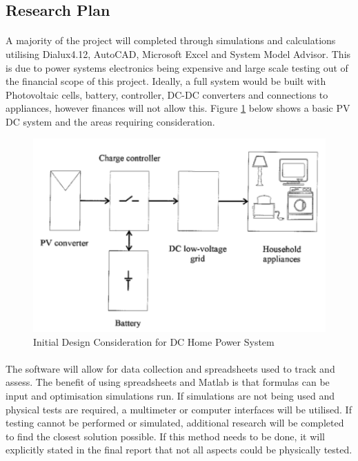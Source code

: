 \subsection{Research Plan}

\paragraph{}
A majority of the project will completed through simulations and calculations utilising Dialux4.12, AutoCAD, Microsoft Excel and System Model Advisor. This is due to power systems electronics being expensive and large scale testing out of the financial scope of this project. Ideally, a full system would be built with Photovoltaic cells, battery, controller, DC-DC converters and connections to appliances, however finances will not allow this. Figure \ref{fig:DCHomeSystem} below shows a basic PV DC system and the areas requiring consideration. 

\begin{figure}[H]
\hfill\includegraphics[width = 120mm]{images/DC_Home}\hspace*{\fill}
\caption{Initial Design Consideration for DC Home Power System \cite{Pellis1997}} 
\label{fig:DCHomeSystem}
\end{figure} 

\paragraph{} 
The software will allow for data collection and spreadsheets used to track and assess. The benefit of using spreadsheets and Matlab is that formulas can be input and optimisation simulations run. If simulations are not being used and physical tests are required, a multimeter or computer interfaces will be utilised. If testing cannot be performed or simulated, additional research will be completed to find the closest solution possible. If this method needs to be done, it will explicitly stated in the final report that not all aspects could be physically tested.     

